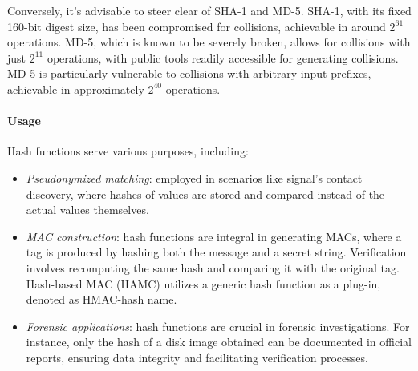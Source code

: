 Conversely, it's advisable to steer clear of SHA-1 and MD-5. 
SHA-1, with its fixed 160-bit digest size, has been compromised for collisions, achievable in around $2^{61}$ operations. 
MD-5, which is known to be severely broken, allows for collisions with just $2^{11}$ operations, with public tools readily accessible for generating collisions. 
MD-5 is particularly vulnerable to collisions with arbitrary input prefixes, achievable in approximately $2^{40}$ operations.

\paragraph*{Usage}
Hash functions serve various purposes, including:
\begin{itemize}
    \item \textit{Pseudonymized matching}: employed in scenarios like signal's contact discovery, where hashes of values are stored and compared instead of the actual values themselves.
    \item \textit{MAC construction}: hash functions are integral in generating MACs, where a tag is produced by hashing both the message and a secret string. 
        Verification involves recomputing the same hash and comparing it with the original tag. 
        Hash-based MAC (HAMC) utilizes a generic hash function as a plug-in, denoted as HMAC-hash name. 
    \item \textit{Forensic applications}: hash functions are crucial in forensic investigations. 
        For instance, only the hash of a disk image obtained can be documented in official reports, ensuring data integrity and facilitating verification processes.
\end{itemize}
